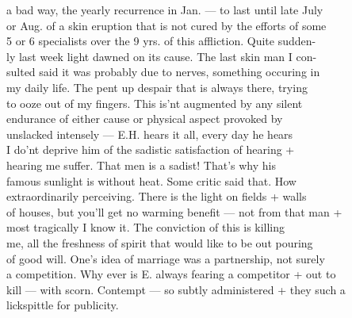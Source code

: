 \documentclass[11pt,a4paper]{article}
\begin{document}
{a bad way, the yearly recurrence in Jan. --- to last until late July \\
or Aug. of a skin eruption that is not cured by the efforts of some \\
5 or 6 specialists over the 9 yrs. of this affliction. Quite sudden- \\
ly last week light dawned on its cause. The last skin man I con- \\
sulted said it was probably due to nerves, something occuring in \\
my daily life. The pent up despair that is always there, trying \\
to ooze out of my fingers. This is'nt augmented by any silent \\
endurance of either cause or physical aspect provoked by \\
unslacked intensely --- E.H. hears it all, every day he hears \\
I do'nt deprive him of the sadistic satisfaction of hearing + \\
hearing me suffer. That men is a sadist! That's why his \\
famous sunlight is without heat. Some critic said that. How \\
extraordinarily perceiving. There is the light on fields + walls \\
of houses, but you'll get no warming benefit --- not from that man + \\
most tragically I know it. The conviction of this is killing \\
me, all the freshness of spirit that would like to be out pouring \\
of good will. \qquad One's idea of marriage was a partnership, not surely \\
a competition. Why ever is E. always fearing a competitor + out to \\
kill --- with scorn. Contempt --- so subtly administered + they such a \\
lickspittle for publicity.}



\end{document}
